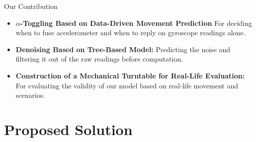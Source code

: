 \documentclass[aspectratio=169,xcolor=dvipsnames]{beamer}
\begin{document}
\begin{frame}{Our Contribution}
\begin{itemize}[<+->]
    \item \textbf{$\alpha$-Toggling Based on Data-Driven Movement Prediction} For deciding when to fuse accelerometer and when to reply on gyroscope readings alone. 
    \item \textbf{Denoising Based on Tree-Based Model:} Predicting the noise and filtering it out of the raw readings before computation. 
    \item \textbf{Construction of a Mechanical Turntable for Real-Life Evaluation:} For evaluating the validity of our model based on real-life movement and scenarios.  
\end{itemize}

\end{frame}


\section{Proposed Solution}
\end{document}
